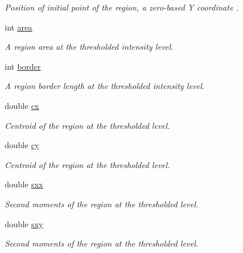 \begin{CompactItemize}
\begin{CompactList}\small\item\em Position of initial point of the region, a zero-based Y coordinate . \item\end{CompactList}\item 
int \hyperlink{structextrema_1_1Region_573afdd043f42a07933a77b4f6981f4e}{area}
\begin{CompactList}\small\item\em A region area at the thresholded intensity level. \item\end{CompactList}\item 
int \hyperlink{structextrema_1_1Region_534285d4c66cb5625bc88a41f168910f}{border}
\begin{CompactList}\small\item\em A region border length at the thresholded intensity level. \item\end{CompactList}\item 
double \hyperlink{structextrema_1_1Region_076944542ce47e4c2751fd341f12c2ad}{cx}
\begin{CompactList}\small\item\em Centroid of the region at the thresholded level. \item\end{CompactList}\item 
double \hyperlink{structextrema_1_1Region_ef79c517c0945f5b8e56b52b1ceb08ce}{cy}
\begin{CompactList}\small\item\em Centroid of the region at the thresholded level. \item\end{CompactList}\item 
double \hyperlink{structextrema_1_1Region_141bd540c32bfafeee3ed1ffe900955e}{sxx}
\begin{CompactList}\small\item\em Second moments of the region at the thresholded level. \item\end{CompactList}\item 
double \hyperlink{structextrema_1_1Region_a9d4087d7225ac9a51d06ad0bf554eb8}{sxy}
\begin{CompactList}\small\item\em Second moments of the region at the thresholded level. \item\end{CompactList}\item 

\end{CompactItemize}

